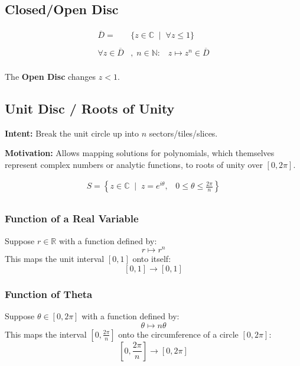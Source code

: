 \subsection{Closed/Open Disc}
\begin{defn}
	\begin{align*}
		\overline{D} = &\{z \in \mathbb{C} \;\;|\;\; \forall z \leq 1 \} \\
		\\
		\forall z \in \overline{D}&, \; n \in \mathbb{N}: \;\;\; z \mapsto z^n \in \overline{D} \\
	\end{align*}
\end{defn}

The \textbf{Open Disc} changes $z < 1.$

\subsection{Unit Disc / Roots of Unity}

\textbf{Intent:} Break the unit circle up into $n$ sectors/tiles/slices.

\textbf{Motivation:} Allows mapping solutions for polynomials, which themselves represent complex numbers or 
analytic functions, to roots of unity over $[0, 2\pi].$

\begin{defn}
	\begin{align*}
		S = \left\{ z \in \mathbb{C} \;\; | \;\; z = e^{i\theta} ,\;\;\;  0 \leq \theta \leq \frac{2\pi}{n} \right\} \\
	\end{align*}
\end{defn}

\subsubsection*{Function of a Real Variable}
Suppose $r \in \mathbb{R}$ with a function defined by:
\[r \mapsto r^n \]
This maps the unit interval $[0, 1]$ onto itself:
\[[0, 1] \to [0, 1] \]

\subsubsection*{Function of Theta}
Suppose $\theta \in [0, 2\pi]$ with a function defined by:
\[\theta \mapsto n\theta \]
This maps the interval $[0, \frac{2\pi}{n}]$ onto the circumference of a circle $[0, 2\pi]$:
\[ \left[ 0, \frac{2\pi}{n} \right] \to [0, 2\pi] \]

